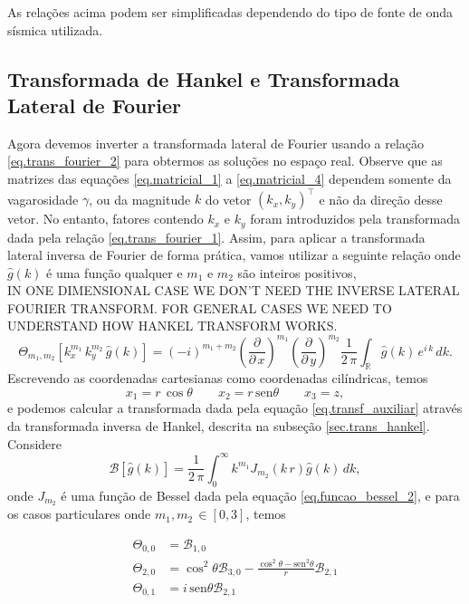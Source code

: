 As rela\c{c}\~oes acima podem ser simplificadas dependendo do tipo de fonte de onda s\'ismica utilizada.


\subsection{Transformada de Hankel e Transformada Lateral de Fourier}

Agora devemos inverter a transformada lateral de Fourier usando a rela\c{c}\~ao \ref{eq.trans_fourier_2} para obtermos as solu\c{c}\~oes no espa\c{c}o real. Observe que as matrizes das equa\c{c}\~oes \ref{eq.matricial_1} a \ref{eq.matricial_4} dependem somente da vagarosidade $\gamma$, ou da magnitude $k$ do vetor $(k_x,k_y)^\top$ e n\~ao da dire\c{c}\~ao desse vetor. No entanto, fatores contendo $k_x$ e $k_y$ foram introduzidos pela transformada dada pela rela\c{c}\~ao \ref{eq.trans_fourier_1}. Assim, para aplicar a transformada lateral inversa de Fourier de forma pr\'atica, vamos utilizar a seguinte rela\c{c}\~ao onde $\hat{g}(k)$ \'e uma fun\c{c}\~ao qualquer e $m_1$ e $m_2$ s\~ao inteiros positivos, \\
IN ONE DIMENSIONAL CASE WE DON'T NEED THE INVERSE LATERAL FOURIER TRANSFORM. FOR GENERAL CASES WE NEED TO UNDERSTAND HOW HANKEL TRANSFORM WORKS.
\begin{equation}\label{eq.transf_auxiliar}
\Theta_{m_1,m_2}[k_x^{m_1}\,k_y^{m_2}\,\hat{g}(k)]=(-i)^{m_1+m_2}\left(\frac{\partial}{\partial\,x}\right)^{m_1}\left(\frac{\partial}{\partial\,y}\right)^{m_2}\frac{1}{2\,\pi}\int_{\mathbb{R}}\hat{g}(k)\,e^{i\,k}\,dk.
\end{equation}
Escrevendo as coordenadas cartesianas como coordenadas cil\'indricas, temos
\begin{equation}
x_1=r\,\cos\theta\qquad x_2=r\,\text{sen}\theta\qquad x_3=z,
\end{equation}
e podemos calcular a transformada dada pela equa\c{c}\~ao \ref{eq.transf_auxiliar} atrav\'es da transformada inversa de Hankel, descrita na subse\c{c}\~ao \ref{sec.trans_hankel}. Considere
\begin{equation}\label{eq.trans_hankel_adapt}
\mathcal{B}[\hat{g}(k)]=\frac{1}{2\,\pi}\int_0^\infty k^{m_1}J_{m_2}(k\,r)\hat{g}(k)\,dk,
\end{equation}
onde $J_{m_2}$ \'e uma fun\c{c}\~ao de Bessel dada pela equa\c{c}\~ao \ref{eq.funcao_bessel_2}, e para os casos particulares onde $m_1,m_2\,\in[0,3]$, temos\\
\begin{minipage}{.5\textwidth}
\begin{align*}
\Theta_{0,0}&=\mathcal{B}_{1,0}\\
\Theta_{2,0}&=\cos^2\theta\mathcal{B}_{3,0}-\frac{\cos^2\theta-\text{sen}^2\theta}{r}\mathcal{B}_{2,1}\\
\Theta_{0,1}&=i\,\text{sen}\theta\mathcal{B}_{2,1}
\end{align*}
\end{minipage}
